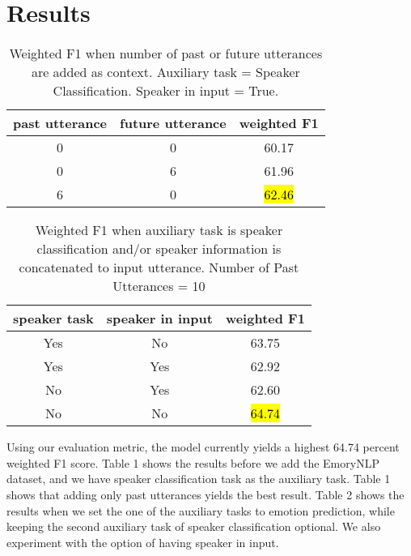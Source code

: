 \documentclass[11pt]{article}
\begin{document}
\section{Results}
\label{sec:results}

\begin{table}[hbt]
  \centering
  \begin{tabular}{c|c|c}
    past utterance & future utterance & weighted F1 \\
    \hline
    0 & 0 & 60.17 \\
    \hline
    0 & 6 & 61.96 \\
    \hline
    6 & 0 & \hl{62.46} \\
  \end{tabular}
  \caption{Weighted F1 when number of past or future utterances are added as context. Auxiliary task = Speaker Classification. Speaker in input = True.}
\end{table}

\begin{table}[hbt]
  \centering
  \begin{tabular}{c|c|c}
    speaker task & speaker in input & weighted F1 \\
    \hline
    Yes & No & 63.75 \\
    \hline
    Yes & Yes & 62.92 \\
    \hline
    No & Yes & 62.60 \\
    \hline
    No & No & \hl{64.74} \\
  \end{tabular}
  \caption{Weighted F1 when auxiliary task is speaker classification and/or speaker information is concatenated to input utterance. Number of Past Utterances = 10}
\end{table}

Using our evaluation metric, the model currently yields a highest 64.74 percent weighted F1 score. Table 1 shows the results before we add the EmoryNLP dataset, and we have speaker classification task as the auxiliary task. Table 1 shows that adding only past utterances yields the best result. Table 2 shows the results when we set the one of the auxiliary tasks to emotion prediction, while keeping the second auxiliary task of speaker classification optional. We also experiment with the option of having speaker in input. 
\end{document}
